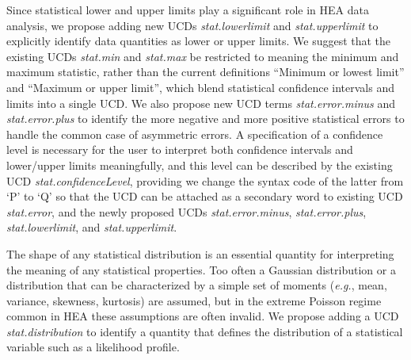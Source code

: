 \documentclass[11pt,a4paper]{ivoa}
\begin{document}
Since statistical lower and upper limits play a significant role in \gls{HEA} data analysis, we propose adding new UCDs {\em stat.lowerlimit\/} and {\em stat.upperlimit\/} to explicitly identify data quantities as lower or upper limits.  We suggest that the existing UCDs {\em stat.min\/} and {\em stat.max\/} be restricted to meaning the minimum and maximum statistic, rather than the current definitions ``Minimum or lowest limit'' and ``Maximum or upper limit'', which blend statistical confidence intervals and limits into a  single UCD\null.
We also propose new UCD terms {\em stat.error.minus\/} and {\em stat.error.plus\/} to identify the more negative and more positive statistical errors to handle the common case of asymmetric errors.
 A specification of a confidence level is necessary for the user to interpret both confidence intervals and lower/upper limits meaningfully, and this level can be described by the existing UCD {\em stat.confidenceLevel\/}, providing we change the syntax code of the latter from `P' to `Q' so that the UCD can be attached as a secondary word to existing UCD {\em stat.error\/}, and the newly proposed UCDs {\em stat.error.minus\/}, {\em stat.error.plus\/}, {\em stat.lowerlimit\/}, and {\em stat.upperlimit\/}.



The shape of any statistical distribution is an essential quantity for interpreting the meaning of any statistical properties.  Too often a Gaussian distribution or a distribution that can be characterized by a simple set of moments ({\em e.g.\/}, mean, variance, skewness, kurtosis) are assumed, but in the extreme Poisson regime common in \gls{HEA} these assumptions are often invalid.  We propose adding a UCD {\em stat.distribution\/} to identify a quantity that defines the distribution of a statistical variable such as  a likelihood profile.
\end{document}
